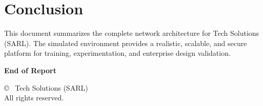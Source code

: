 \documentclass[12pt,a4paper]{article}
\begin{document}
\section{Conclusion}

This document summarizes the complete network architecture for Tech Solutions (SARL).  
The simulated environment provides a realistic, scalable, and secure platform for training, experimentation, and enterprise design validation.

\clearpage
\thispagestyle{empty}

\vspace*{\fill}

\begin{center}
\textbf{End of Report}

\vspace{0.6cm}

\small
© \the\year\ Tech Solutions (SARL)\\
All rights reserved.
\end{center}

\vspace*{\fill}
\end{document}
